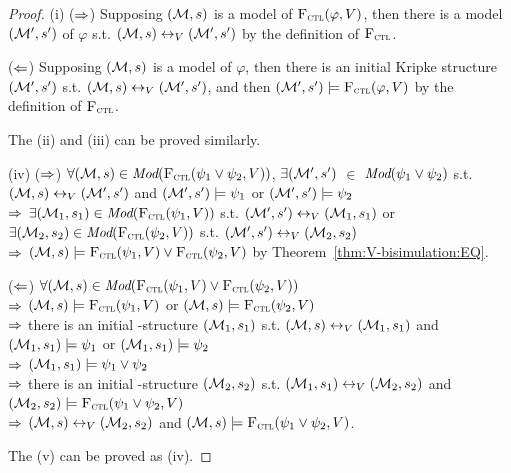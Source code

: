 \documentclass[letterpaper]{article} %
\begin{document}
\begin{proof}
(i) ($\Rightarrow$) Supposing $({\cal M}, s)$ is a model of ${\textsc{F}_{\textsc{ctl}}}(\varphi, V)$, then there is a model $({\cal M}',s')$ of $\varphi$ s.t. $({\cal M},s) \leftrightarrow_V ({\cal M}',s')$ by the definition of ${\textsc{F}_{\textsc{ctl}}}$.

($\Leftarrow$) Supposing $({\cal M}, s)$ is a model of $\varphi$, then there is an initial Kripke structure $({\cal M}',s')$ s.t. $({\cal M},s) \leftrightarrow_V ({\cal M}',s')$, and then $({\cal M}',s') \models {\textsc{F}_{\textsc{ctl}}}(\varphi, V)$ by the definition of ${\textsc{F}_{\textsc{ctl}}}$.

The (ii) and (iii) can be proved similarly.

(iv) ($\Rightarrow$) $\forall ({\cal M},s)\in \textit{Mod}({\textsc{F}_{\textsc{ctl}}}(\psi_1 \vee \psi_2, V))$, $\exists ({\cal M}',s')$ $\in$  $\textit{Mod}(\psi_1\vee \psi_2)$ s.t. $({\cal M},s) \leftrightarrow_V ({\cal M}',s')$ and $({\cal M}',s') \models \psi_1$ or $({\cal M}',s') \models \psi_2$ \\
$\Rightarrow$ $\exists ({\cal M}_1,s_1) \in \textit{Mod}({\textsc{F}_{\textsc{ctl}}}(\psi_1, V))$ s.t. $({\cal M}',s') \leftrightarrow_V ({\cal M}_1,s_1)$ or $\exists ({\cal M}_2,s_2) \in \textit{Mod}({\textsc{F}_{\textsc{ctl}}}(\psi_2, V))$ s.t. $({\cal M}',s') \leftrightarrow_V ({\cal M}_2,s_2)$ \\
$\Rightarrow$ $({\cal M},s) \models {\textsc{F}_{\textsc{ctl}}}(\psi_1, V) \vee {\textsc{F}_{\textsc{ctl}}}(\psi_2, V)$ by Theorem~\ref{thm:V-bisimulation:EQ}.

($\Leftarrow$) $\forall ({\cal M},s) \in \textit{Mod}({\textsc{F}_{\textsc{ctl}}}(\psi_1, V) \vee {\textsc{F}_{\textsc{ctl}}}(\psi_2, V))$\\
$\Rightarrow$ $({\cal M},s) \models {\textsc{F}_{\textsc{ctl}}}(\psi_1,V)$ or $({\cal M},s) \models {\textsc{F}_{\textsc{ctl}}}(\psi_2,V)$\\
$\Rightarrow$ there is an initial \MPK-structure $({\cal M}_1,s_1)$ s.t. $({\cal M},s) \leftrightarrow_V ({\cal M}_1,s_1)$ and $({\cal M}_1,s_1) \models \psi_1$ or  $({\cal M}_1,s_1) \models \psi_2$\\
$\Rightarrow$ $({\cal M}_1,s_1) \models \psi_1 \vee \psi_2$\\
$\Rightarrow$ there is an initial \MPK-structure $({\cal M}_2,s_2)$ s.t. $({\cal M}_1,s_1) \leftrightarrow_V ({\cal M}_2,s_2)$ and $({\cal M}_2,s_2) \models {\textsc{F}_{\textsc{ctl}}}(\psi_1 \vee \psi_2, V)$\\
$\Rightarrow$ $({\cal M},s) \leftrightarrow_V ({\cal M}_2,s_2)$ and $({\cal M},s) \models {\textsc{F}_{\textsc{ctl}}}(\psi_1 \vee \psi_2, V)$.

The (v) can be proved as (iv).
\end{proof}
\end{document}
